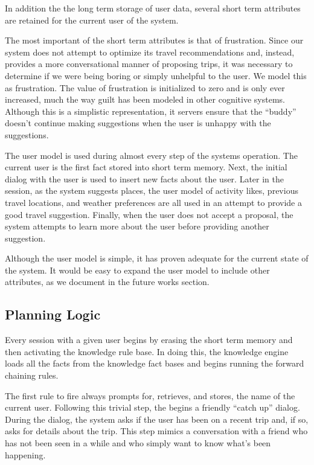 \documentclass[11pt]{article} %
\begin{document}
In addition the the long term storage of user data, several short term attributes are retained for the current user of the system.

The most important of the short term attributes is that of frustration. Since our system does not attempt to optimize its travel recommendations and, instead, provides a more conversational manner of proposing trips, it was necessary to determine if we were being boring or simply unhelpful to the user. We model this as frustration. The value of frustration is initialized to zero and is only ever increased, much the way guilt has been modeled in other cognitive systems\cite{arkin09}. Although this is a simplistic representation, it servers ensure that the ``buddy'' doesn't continue making suggestions when the user is unhappy with the suggestions.

The user model is used during almost every step of the systems operation. The current user is the first fact stored into short term memory. Next, the initial dialog with the user is used to insert new facts about the user. Later in the session, as the system suggests places, the user model of activity likes, previous travel locations, and weather preferences are all used in an attempt to provide a good travel suggestion. Finally, when the user does not accept a proposal, the system attempts to learn more about the user before providing another suggestion.

Although the user model is simple, it has proven adequate for the current state of the system. It would be easy to expand the user model to include other attributes, as we document in the future works section.

\subsection{Planning Logic}
Every session with a given user begins by erasing the short term memory and then activating the knowledge rule base. In doing this, the knowledge engine loads all the facts from the knowledge fact bases and begins running the forward chaining rules.

The first rule to fire always prompts for, retrieves, and stores, the name of the current user. Following this trivial step, the begins a friendly ``catch up'' dialog. During the dialog, the system asks if the user has been on a recent trip and, if so, asks for details about the trip. This step mimics a conversation with a friend who has not been seen in a while and who simply want to know what's been happening.
\end{document}
